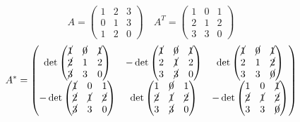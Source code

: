 \documentclass[a4paper]{article}
\theoremstyle{break}
\theoremstyle{break}
\theoremstyle{break}
\theoremstyle{break}
\begin{document}
\begin{figure}[H]
  \begin{example}
    \[
    A = \begin{pmatrix} 
      1 & 2 & 3\\
      0 & 1 & 3\\
      1 & 2 & 0
    \end{pmatrix} 
    \quad
    A^T = \begin{pmatrix} 
      1 & 0 & 1\\
      2 & 1 & 2\\
      3 & 3 & 0
    \end{pmatrix} 
    \] 
    \[
    A^* = \begin{pmatrix} 
      \det\begin{pmatrix} 
        \cancel{1} & \cancel{0} & \cancel{1} \\
        \cancel{2} & 1 & 2\\
        \cancel{3} & 3 & 0
      \end{pmatrix}  & -\det\begin{pmatrix} 
      \cancel{1} & \cancel{0} & \cancel{1}\\
      2 & \cancel{1} & 2\\
      3 & \cancel{3} & 0
    \end{pmatrix} & \det\begin{pmatrix} 
    \cancel{1} & \cancel{0} & \cancel{1}\\
    2 & 1 & \cancel{2} \\
    3 & 3 & \cancel{0}
    \end{pmatrix}\\
      -\det \begin{pmatrix} 
        \cancel{1} & 0 & 1 \\
        \cancel{2} & \cancel{1} & \cancel{2}\\
        \cancel{3} & 3 & 0
      \end{pmatrix} & 
      \det \begin{pmatrix} 
        1 & \cancel{0} & 1 \\
        \cancel{2} & \cancel{1} & \cancel{2}\\
        3 & \cancel{3} & 0
      \end{pmatrix} &
      -\det \begin{pmatrix} 
        1 & 0 & \cancel{1} \\
        \cancel{2} & \cancel{1} & \cancel{2}\\
        3 & 3 & \cancel{0}
      \end{pmatrix}\\

\end{pmatrix}\]
\end{example}
\end{figure}
\end{document}
